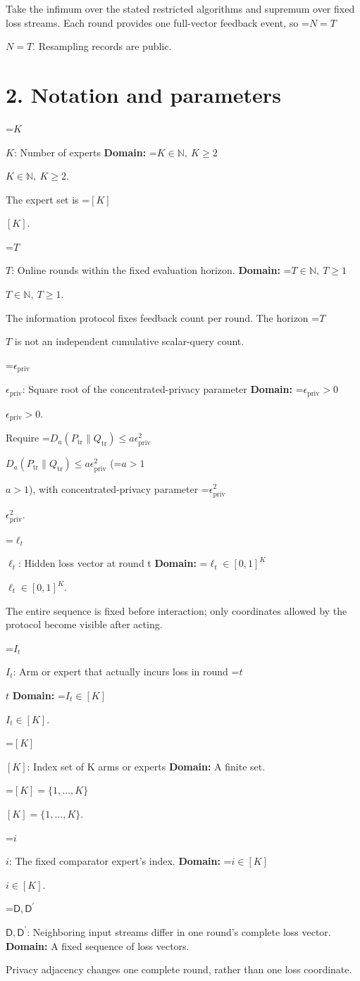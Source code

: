 \documentclass[10pt,a4paper]{article}
\newcommand{\AtlasMath}[1]{\par\begingroup\centering\setbox0=\hbox{$\displaystyle #1$}\ifdim\wd0>1.4\linewidth\typeout{ATLAS WIDE FORMULA: \the\wd0}\fi\ifdim\wd0>\linewidth\resizebox{\linewidth}{!}{\box0}\else\box0\fi\par\endgroup}
\newcommand{\AtlasInlineMath}[1]{\begingroup\setbox0=\hbox{$#1$}\ifdim\wd0>.4\linewidth\endgroup\AtlasMath{#1}\else\endgroup$#1$\fi}
\begin{document}
Take the infimum over the stated restricted algorithms and supremum over fixed loss streams. Each round provides one full-vector feedback event, so \AtlasInlineMath{N=T}. Resampling records are public.

\section{2. Notation and parameters}
\AtlasInlineMath{K}: Number of experts \textbf{Domain:} \AtlasInlineMath{K\in\mathbb N,\ K\ge2}.

The expert set is \AtlasInlineMath{[K]}.

\AtlasInlineMath{T}: Online rounds within the fixed evaluation horizon. \textbf{Domain:} \AtlasInlineMath{T\in\mathbb N,\ T\ge1}.

The information protocol fixes feedback count per round. The horizon \AtlasInlineMath{T} is not an independent cumulative scalar-query count.

\AtlasInlineMath{\epsilon_{\mathrm{priv}}}: Square root of the concentrated-privacy parameter \textbf{Domain:} \AtlasInlineMath{\epsilon_{\mathrm{priv}}>0}.

Require \AtlasInlineMath{D_a(P_{\mathrm{tr}}\|Q_{\mathrm{tr}})\le a\epsilon_{\mathrm{priv}}^2} (\AtlasInlineMath{a>1}), with concentrated-privacy parameter \AtlasInlineMath{\epsilon_{\mathrm{priv}}^2}.

\AtlasInlineMath{\ell_t}: Hidden loss vector at round t \textbf{Domain:} \AtlasInlineMath{\ell_t\in[0,1]^K}.

The entire sequence is fixed before interaction; only coordinates allowed by the protocol become visible after acting.

\AtlasInlineMath{I_t}: Arm or expert that actually incurs loss in round \AtlasInlineMath{t} \textbf{Domain:} \AtlasInlineMath{I_t\in[K]}.

\AtlasInlineMath{[K]}: Index set of K arms or experts \textbf{Domain:} A finite set.

\AtlasInlineMath{[K]=\{1,\ldots,K\}}.

\AtlasInlineMath{i}: The fixed comparator expert’s index. \textbf{Domain:} \AtlasInlineMath{i\in[K]}.

\AtlasInlineMath{\mathsf D,\mathsf D^{\prime}}: Neighboring input streams differ in one round's complete loss vector. \textbf{Domain:} A fixed sequence of loss vectors.

Privacy adjacency changes one complete round, rather than one loss coordinate.
\end{document}

